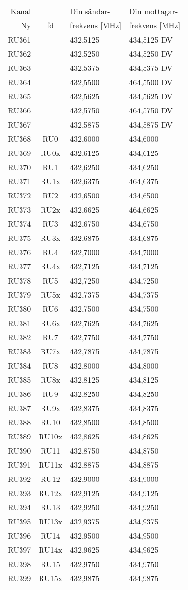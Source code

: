 \begin{tabular}{ r | c | l | l }
	Kanal & & Din sändar- & Din mottagar- \\
	Ny    & fd & frekvens [MHz] & frekvens [MHz] \\
	\hline
	RU361 & & 432,5125 & 434,5125 DV\\
	RU362 & & 432,5250 & 434,5250 DV\\
	RU363 & & 432,5375 & 434,5375 DV\\
	RU364 & & 432,5500 & 464,5500 DV\\
	RU365 & & 432,5625 & 434,5625 DV\\
	RU366 & & 432,5750 & 464,5750 DV\\
	RU367 & & 432,5875 & 434,5875 DV\\
	RU368 & RU0 & 432,6000 & 434,6000\\
	RU369 & RU0x & 432,6125 & 434,6125\\
	RU370 & RU1 & 432,6250 & 434,6250\\
	RU371 & RU1x & 432,6375 & 464,6375\\
	RU372 & RU2& 432,6500 & 434,6500\\
	RU373 & RU2x & 432,6625 & 464,6625\\
	RU374 & RU3& 432,6750 & 434,6750\\
	RU375 & RU3x & 432,6875 & 434,6875\\
	RU376 & RU4 & 432,7000 & 434,7000\\
	RU377 & RU4x & 432,7125 & 434,7125\\
	RU378 & RU5 & 432,7250 & 434,7250\\
	RU379 & RU5x & 432,7375 & 434,7375\\
	RU380 & RU6 & 432,7500 & 434,7500\\
	RU381 & RU6x & 432,7625 & 434,7625\\
	RU382 & RU7 & 432,7750 & 434,7750\\
	RU383 & RU7x & 432,7875 & 434,7875\\
	RU384 & RU8 & 432,8000 & 434,8000\\
	RU385 & RU8x & 432,8125 & 434,8125\\
	RU386 & RU9 & 432,8250 & 434,8250\\
	RU387 & RU9x & 432,8375 & 434,8375\\
	RU388 & RU10 & 432,8500 & 434,8500\\
	RU389 & RU10x & 432,8625 & 434,8625\\
	RU390 & RU11 & 432,8750 & 434,8750\\
	RU391 & RU11x & 432,8875 & 434,8875\\
	RU392 & RU12 & 432,9000 & 434,9000\\
	RU393 & RU12x & 432,9125 & 434,9125\\
	RU394 & RU13 & 432,9250 & 434,9250\\
	RU395 & RU13x & 432,9375 & 434,9375\\
	RU396 & RU14 & 432,9500 & 434,9500\\
	RU397 & RU14x & 432,9625 & 434,9625\\
	RU398 & RU15 & 432,9750 & 434,9750\\
	RU399 & RU15x & 432,9875 & 434,9875\\
\end{tabular}

